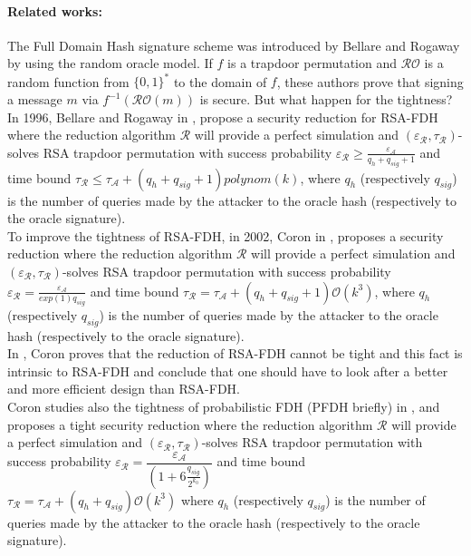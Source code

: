\documentclass[a4paper,11pt]{article}
\begin{document}
\paragraph{Related works:}
The Full Domain Hash signature scheme was introduced by Bellare and Rogaway \cite{Bellare2}   by using the random oracle model. If $f$ is a trapdoor permutation and $\mathcal{RO}$ is a random function from $\{0, 1\}^{*}$ to the domain of $f$, these authors prove that signing a message $m$ via $f^{-1}(\mathcal{RO}(m))$ is secure. But what happen for the tightness?\\
In 1996,  Bellare and Rogaway in \cite{Bellare2}, propose a security reduction for RSA-FDH where the reduction algorithm  $\mathcal{R}$ will provide a perfect simulation and $(\varepsilon_{\mathcal{R}}, \tau_{\mathcal{R}})$-solves RSA trapdoor permutation with success probability $\varepsilon_{\mathcal{R}} \geq \frac{\varepsilon_{\mathcal{A}}}{q_{h}+q_{sig}+1}$ and time bound $\tau_{\mathcal{R}}\leq \tau_{\mathcal{A}} + (q_{h}+q_{sig}+1)polynom(k)$, where $q_{h}$ (respectively $q_{sig}$) is the number of queries made by  the attacker to the oracle hash (respectively to the oracle signature).\\
To improve the tightness of RSA-FDH,  in 2002, Coron in \cite{Coron-FDH}, proposes a security reduction where the reduction algorithm  $\mathcal{R}$ will provide a perfect simulation and $(\varepsilon_{\mathcal{R}}, \tau_{\mathcal{R}})$-solves RSA trapdoor permutation with success probability $\varepsilon_{\mathcal{R}} = \frac{\varepsilon_{\mathcal{A}}}{exp(1)q_{sig}}$ and time bound $\tau_{\mathcal{R}}= \tau_{\mathcal{A}} + (q_{h}+q_{sig}+1)\mathcal{O}(k^3)$, where $q_{h}$ (respectively $q_{sig}$) is the number of queries made by  the attacker to the oracle hash (respectively to the oracle signature).\\
In  \cite{Coron-GHR-PSS}, Coron proves that the reduction of RSA-FDH cannot be tight and this fact is intrinsic to RSA-FDH and conclude that one should have to look after a better and  more efficient design than RSA-FDH.\\
Coron studies also the tightness of probabilistic FDH (PFDH briefly)  in \cite{Coron-GHR-PSS}, and  proposes a tight security reduction where the reduction algorithm  $\mathcal{R}$ will provide a perfect simulation and $(\varepsilon_{\mathcal{R}}, \tau_{\mathcal{R}})$-solves RSA trapdoor permutation with success probability $\varepsilon_{\mathcal{R}} = \dfrac{\varepsilon_{\mathcal{A}}}{(1+6\frac{q_{sig}}{2^{k_{0}}})}$ and time bound $\tau_{\mathcal{R}}= \tau_{\mathcal{A}} + (q_{h}+q_{sig})\mathcal{O}(k^3)$ where $q_{h}$ (respectively $q_{sig}$) is the number of queries made by  the attacker to the oracle hash (respectively to the oracle signature).\\
\end{document}
